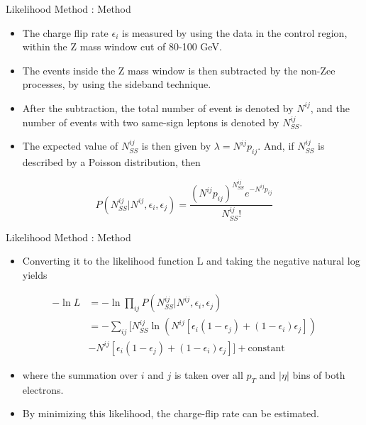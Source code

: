 \documentclass[mathserif,serif]{beamer}
\begin{document}
\begin{frame}{Likelihood Method : Method}
\begin{itemize}
\item The charge flip rate $\epsilon_i$ is measured by using the data in the control region, within the Z mass window cut of 80-100 GeV.
\item The events inside the Z mass window is then subtracted by the non-Zee processes, by using the sideband technique.
\item After the subtraction, the total number of event is denoted by $N^{ij}$, and the number of events with two same-sign leptons is denoted by $N^{ij}_{SS}$.
\item The expected value of $N^{ij}_{SS}$ is then given by $\lambda = N^{ij}p_{ij}$. And, if $N^{ij}_{SS}$ is described by a Poisson distribution, then
\end{itemize}
\begin{equation*}
P(N^{ij}_{SS} | N^{ij}, \epsilon_i, \epsilon_j) = \frac{(N^{ij}p_{ij})^{N^{ij}_{SS}} e^{-N^{ij}p_{ij}}}{N^{ij}_{SS}!}
\end{equation*}
\end{frame}

\begin{frame}{Likelihood Method : Method}
\begin{itemize}
\item Converting it to the likelihood function L and taking the negative natural log yields
\end{itemize}
\begin{equation*}
\begin{split}
-\ln L &= -\ln\prod_{ij} P(N^{ij}_{SS} | N^{ij}, \epsilon_i, \epsilon_j) \\
&= - \sum_{ij} \Big[ N^{ij}_{SS} \ln (N^{ij}[\epsilon_i (1-\epsilon_j) + (1-\epsilon_i) \epsilon_j]) \\
&- N^{ij}[\epsilon_i (1-\epsilon_j) + (1-\epsilon_i) \epsilon_j] \Big] + \text{constant}
\end{split}
\end{equation*}
\begin{itemize}
\item where the summation over $i$ and $j$ is taken over all $p_T$ and $|\eta|$ bins of both electrons.
\item By minimizing this likelihood, the charge-flip rate can be estimated.
\end{itemize}
\end{frame}
\end{document}
